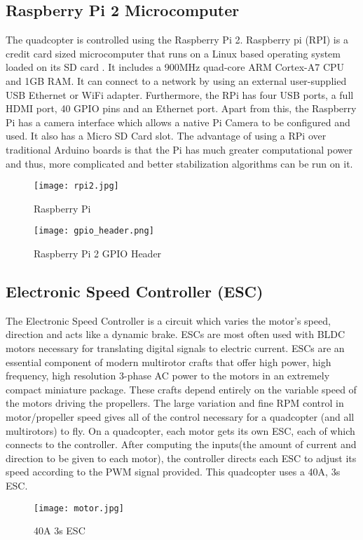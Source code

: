 \subsection{Raspberry Pi 2 Microcomputer}
The quadcopter is controlled using the Raspberry Pi 2. Raspberry pi (RPI) is a credit card sized microcomputer that runs on a Linux based operating system loaded on its SD card . It includes a 900MHz quad-core ARM Cortex-A7 CPU and 1GB RAM.
It can connect to a network by using an external user-supplied USB Ethernet or WiFi adapter. Furthermore, the RPi has four USB ports, a full HDMI port, 40 GPIO pins and an Ethernet port. Apart from this, the Raspberry Pi has a camera interface which allows a native Pi Camera to be configured and used. It also has a Micro SD Card slot. The advantage of using a RPi over traditional Arduino boards is that the Pi has much greater computational power and thus, more complicated and better stabilization algorithms can be run on it. 

\begin{figure}[H]
  \centering
  \texttt{[image: rpi2.jpg]}
  \caption{Raspberry Pi}
  \label{RPi}	
\end{figure}

\begin{figure}[H]
  \centering
  \texttt{[image: gpio\_header.png]}
  \caption{Raspberry Pi 2 GPIO Header}
  \label{RPi Pins} 
\end{figure}


\subsection{Electronic Speed Controller (ESC)}
The Electronic Speed Controller is a circuit which varies the motor's speed, direction and acts like a dynamic brake. ESCs are most often used with BLDC motors necessary for translating digital signals to electric current. ESCs are an essential component of modern multirotor crafts that offer high power, high frequency, high resolution 3-phase AC power to the motors in an extremely compact miniature package. These crafts depend entirely on the variable speed of the motors driving the propellers. The large variation and fine RPM control in motor/propeller speed gives all of the control necessary for a quadcopter (and all multirotors) to fly. On a quadcopter, each motor gets its own ESC, each of which connects to the controller. After computing the inputs(the amount of current and direction to be given to each motor), the controller directs each ESC to adjust its speed according to the PWM signal provided.
This quadcopter uses a 40A, 3s ESC.
\begin{figure}[H]
  \centering
  \texttt{[image: motor.jpg]}
  \caption{40A 3s ESC}
  \label{40A 3s ESC}	
\end{figure}



